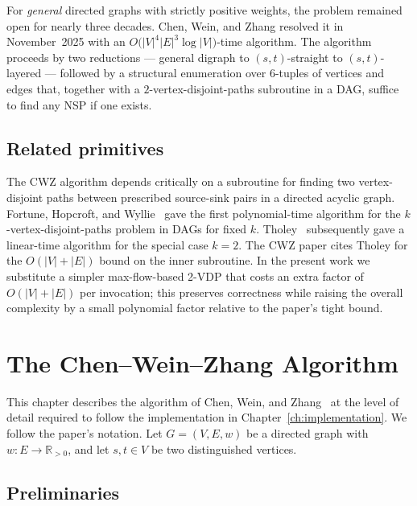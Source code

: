 For \emph{general} directed graphs with strictly positive weights, the
problem remained open for nearly three decades. Chen, Wein, and Zhang
\cite{ChenWeinZhang2025} resolved it in November~2025 with an
$O\bigl(|V|^{4}|E|^{3}\log|V|\bigr)$-time algorithm. The algorithm proceeds
by two reductions --- general digraph to $(s,t)$-straight to $(s,t)$-layered
--- followed by a structural enumeration over $6$-tuples of vertices and
edges that, together with a $2$-vertex-disjoint-paths subroutine in a DAG,
suffice to find any NSP if one exists.

\section{Related primitives}

The CWZ algorithm depends critically on a subroutine for finding two
vertex-disjoint paths between prescribed source-sink pairs in a directed
acyclic graph. Fortune, Hopcroft, and Wyllie~\cite{FortuneHopcroftWyllie1980}
gave the first polynomial-time algorithm for the $k$-vertex-disjoint-paths
problem in DAGs for fixed $k$. Tholey~\cite{Tholey2012} subsequently gave a
linear-time algorithm for the special case $k=2$. The CWZ paper cites Tholey
for the $O(|V|+|E|)$ bound on the inner subroutine. In the present work we
substitute a simpler max-flow-based 2-VDP that costs an extra factor of
$O(|V|+|E|)$ per invocation; this preserves correctness while raising the
overall complexity by a small polynomial factor relative to the paper's
tight bound.

\chapter{The Chen--Wein--Zhang Algorithm}
\label{ch:algorithm}

This chapter describes the algorithm of Chen, Wein, and
Zhang~\cite{ChenWeinZhang2025} at the level of detail required to follow the
implementation in Chapter~\ref{ch:implementation}. We follow the paper's
notation. Let $G=(V,E,w)$ be a directed graph with $w:E\to\mathbb{R}_{>0}$,
and let $s,t\in V$ be two distinguished vertices.

\section{Preliminaries}

